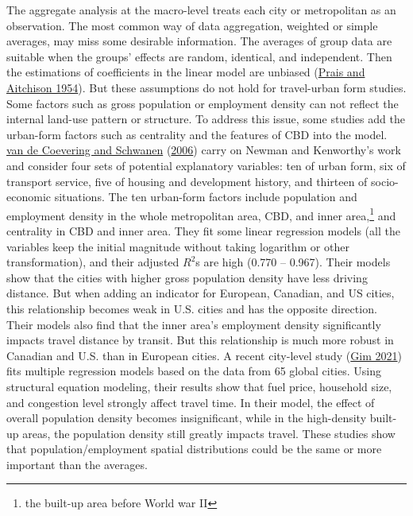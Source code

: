 \documentclass[
  12pt,
]{article}
\begin{document}
The aggregate analysis at the macro-level treats each city or metropolitan as an observation. The most common way of data aggregation, weighted or simple averages, may miss some desirable information. The averages of group data are suitable when the groups' effects are random, identical, and independent. Then the estimations of coefficients in the linear model are unbiased (\protect\hyperlink{ref-praisGroupingObservationsRegression1954}{Prais and Aitchison 1954}). But these assumptions do not hold for travel-urban form studies. Some factors such as gross population or employment density can not reflect the internal land-use pattern or structure. To address this issue, some studies add the urban-form factors such as centrality and the features of CBD into the model. \protect\hyperlink{ref-vandecoeveringReevaluatingImpactUrban2006}{van de Coevering and Schwanen} (\protect\hyperlink{ref-vandecoeveringReevaluatingImpactUrban2006}{2006}) carry on Newman and Kenworthy's work and consider four sets of potential explanatory variables: ten of urban form, six of transport service, five of housing and development history, and thirteen of socio-economic situations. The ten urban-form factors include population and employment density in the whole metropolitan area, CBD, and inner area,\footnote{the built-up area before World war II} and centrality in CBD and inner area. They fit some linear regression models (all the variables keep the initial magnitude without taking logarithm or other transformation), and their adjusted \(R^2\)s are high (0.770 -- 0.967). Their models show that the cities with higher gross population density have less driving distance. But when adding an indicator for European, Canadian, and US cities, this relationship becomes weak in U.S. cities and has the opposite direction. Their models also find that the inner area's employment density significantly impacts travel distance by transit. But this relationship is much more robust in Canadian and U.S. than in European cities. A recent city-level study (\protect\hyperlink{ref-gimAnalyzingCitylevelEffects2021}{Gim 2021}) fits multiple regression models based on the data from 65 global cities. Using structural equation modeling, their results show that fuel price, household size, and congestion level strongly affect travel time. In their model, the effect of overall population density becomes insignificant, while in the high-density built-up areas, the population density still greatly impacts travel. These studies show that population/employment spatial distributions could be the same or more important than the averages.
\end{document}
